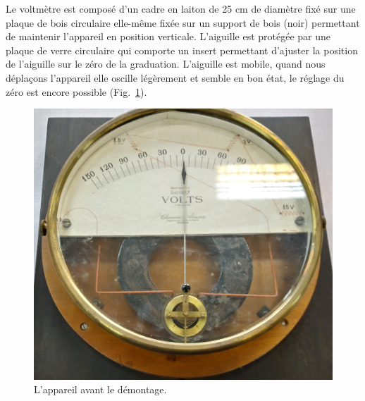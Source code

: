 \documentclass[12pt,a4paper,fleqn]{article}
\begin{document}
Le voltmètre est composé d'un cadre en laiton de 25 cm de diamètre fixé sur une plaque de bois circulaire elle-même fixée sur un support de bois (noir) permettant de maintenir l'appareil en position verticale.
L'aiguille est protégée par une plaque de verre circulaire qui comporte un insert permettant d'ajuster la position de l'aiguille sur le zéro de la graduation.
L'aiguille est mobile, quand nous déplaçons l'appareil elle oscille légèrement et semble en bon état, le réglage du zéro est encore possible (Fig.~\ref{fig:galva_volt_av}).
\begin{figure}[htbp]
    \center
    \includegraphics[height=300 pt]{images/20210205_150347_HDR.jpg}
    \caption{L'appareil avant le démontage.}
    \label{fig:galva_volt_av}
\end{figure}
\end{document}
